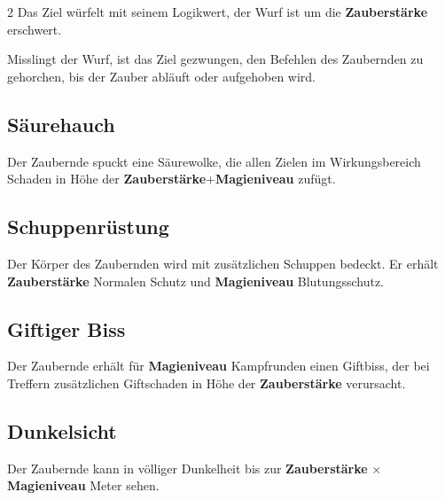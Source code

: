 \begin{multicols*}{2}
Das Ziel würfelt mit seinem Logikwert, der Wurf ist um die \textbf{Zauberstärke} erschwert.

Misslingt der Wurf, ist das Ziel gezwungen, den Befehlen des Zaubernden zu gehorchen, bis der Zauber abläuft oder aufgehoben wird.



\subsection{Säurehauch}

Der Zaubernde spuckt eine Säurewolke, die allen Zielen im Wirkungsbereich Schaden in Höhe der \textbf{Zauberstärke}+\textbf{Magieniveau} zufügt.



\subsection{Schuppenrüstung}

Der Körper des Zaubernden wird mit zusätzlichen Schuppen bedeckt. Er erhält \textbf{Zauberstärke} Normalen Schutz und \textbf{Magieniveau} Blutungsschutz.



\subsection{Giftiger Biss}

Der Zaubernde erhält für \textbf{Magieniveau} Kampfrunden einen Giftbiss, der bei Treffern zusätzlichen Giftschaden in Höhe der \textbf{Zauberstärke} verursacht.



\subsection{Dunkelsicht}

Der Zaubernde kann in völliger Dunkelheit bis zur \textbf{Zauberstärke} × \textbf{Magieniveau} Meter sehen.


\end{multicols*}
